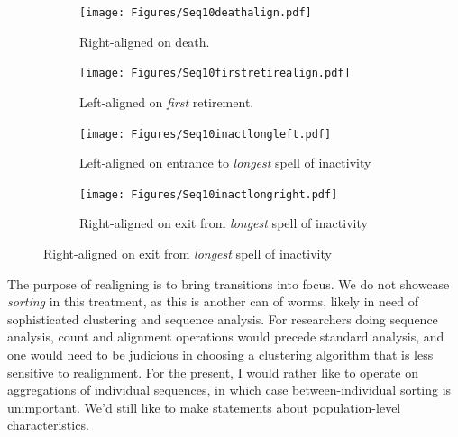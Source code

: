 \documentclass{article}
\begin{document}
 \begin{figure}[ht!]
\centering
\caption{The sequences from Figure~\ref{fig:seq10} under a variety of alignment
types.}
\label{fig:alignment}

\begin{subfigure}{\textwidth}
\centering
\caption{Right-aligned on death.}
\label{fig:seq10death}
\texttt{[image: Figures/Seq10deathalign.pdf]}
\end{subfigure}

\begin{subfigure}{\textwidth}
\centering
\caption{Left-aligned on \emph{first} retirement.}
\label{fig:firstretire}
\texttt{[image: Figures/Seq10firstretirealign.pdf]}
\end{subfigure}

\begin{subfigure}{\textwidth}
\centering
\caption{Left-aligned on entrance to \emph{longest} spell of inactivity}
\label{fig:longinactleft}
\texttt{[image: Figures/Seq10inactlongleft.pdf]}
\end{subfigure}

\begin{subfigure}{\textwidth}
\centering
\caption{Right-aligned on exit from \emph{longest} spell of inactivity}
\label{fig:longinactright}
\texttt{[image: Figures/Seq10inactlongright.pdf]}
\end{subfigure}

\end{figure}

The purpose of realigning is to bring transitions into focus. We do not showcase
\emph{sorting} in this treatment, as this is another can of worms, likely in
need of sophisticated clustering and sequence analysis. For researchers doing
sequence analysis, count and alignment operations would precede standard
analysis, and one would need to be judicious in choosing a clustering algorithm
that is less sensitive to realignment. For the present, I would rather
like to operate on aggregations of individual sequences, in which case between-individual sorting is unimportant. We'd still like to make statements about population-level characteristics.

\FloatBarrier
\end{document}

